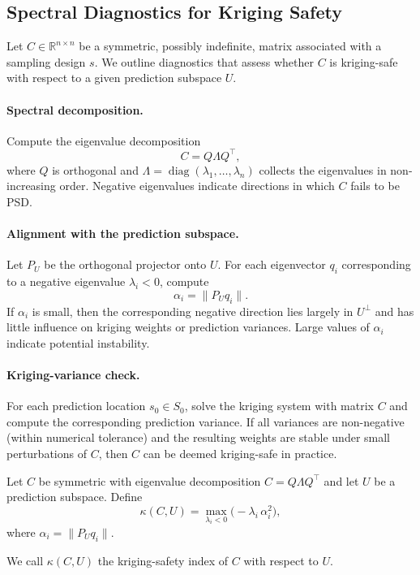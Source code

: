 \documentclass[smallextended]{svjour3}
\newcommand{\R}{\mathbb{R}}
\newcommand{\T}{\top}
\newcommand{\1}{\mathbf{1}}
\DeclareMathOperator{\diag}{diag}
\begin{document}
\subsection{Spectral Diagnostics for Kriging Safety}

Let $C \in \R^{n \times n}$ be a symmetric, possibly indefinite, matrix associated with a sampling design $s$.
We outline diagnostics that assess whether $C$ is kriging-safe with respect to a given prediction subspace $U$.

\paragraph{Spectral decomposition.}
Compute the eigenvalue decomposition
\[
C = Q \Lambda Q^{\T},
\]
where $Q$ is orthogonal and $\Lambda = \diag(\lambda_1,\dots,\lambda_n)$ collects the eigenvalues in non-increasing order.
Negative eigenvalues indicate directions in which $C$ fails to be PSD.

\paragraph{Alignment with the prediction subspace.}
Let $P_U$ be the orthogonal projector onto $U$.
For each eigenvector $q_i$ corresponding to a negative eigenvalue $\lambda_i < 0$, compute
\[
\alpha_i = \| P_U q_i \|.
\]
If $\alpha_i$ is small, then the corresponding negative direction lies largely in $U^{\perp}$ and has little influence on kriging weights or prediction variances.
Large values of $\alpha_i$ indicate potential instability.

\paragraph{Kriging-variance check.}
For each prediction location $s_0 \in S_0$, solve the kriging system with matrix $C$ and compute the corresponding prediction variance.
If all variances are non-negative (within numerical tolerance) and the resulting weights are stable under small perturbations of $C$, then $C$ can be deemed kriging-safe in practice.

\begin{definition} 
	Let $C$ be symmetric with eigenvalue decomposition $C = Q \Lambda Q^{\T}$ and let $U$ be a prediction subspace.
	Define
	\[
	\kappa(C,U)
	=
	\max_{\lambda_i < 0} \bigl( -\lambda_i \, \alpha_i^2 \bigr),
	\]
	where $\alpha_i = \| P_U q_i \|$.
	
	We call $\kappa(C,U)$ the kriging-safety index of $C$ with respect to $U$.
\end{definition}
\end{document}
